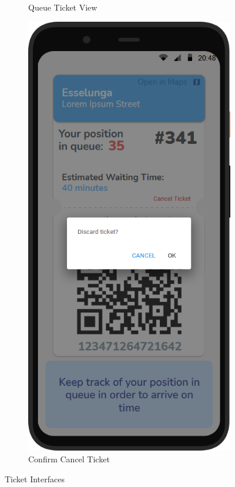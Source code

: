\begin{figure}[H]
\begin{subfigure}{.33\textwidth}
        \caption{Queue Ticket View}
        \label{fig:screen9}
    \end{subfigure}
    \begin{subfigure}{.33\textwidth}
        \centering
        \includegraphics[width=.95\linewidth]{Images/screen_10.png}
        \caption{Confirm Cancel Ticket}
        \label{fig:screen10}
    \end{subfigure}
    \caption{Ticket Interfaces}
\end{figure}